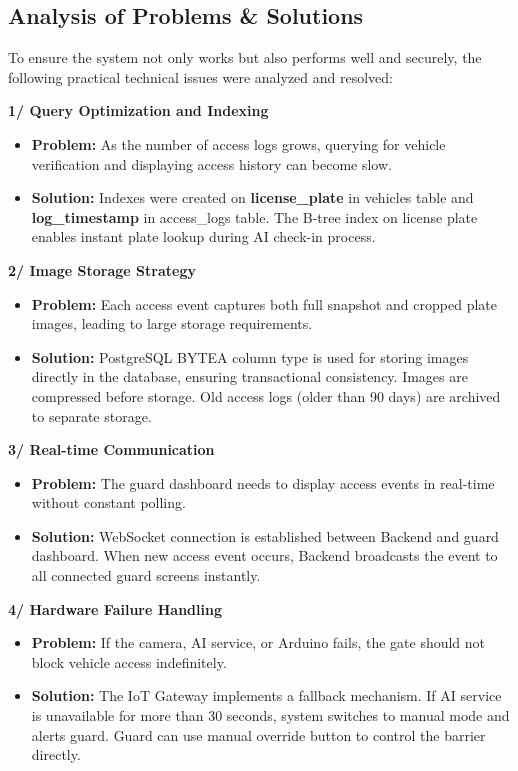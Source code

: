 \documentclass[a4paper]{article}
\begin{document}
\subsection{Analysis of Problems \& Solutions}
To ensure the system not only works but also performs well and securely, the following practical technical issues were analyzed and resolved:

\noindent \textbf{1/ Query Optimization and Indexing}
\begin{itemize}
    \item \textbf{Problem:} As the number of access logs grows, querying for vehicle verification and displaying access history can become slow.
    \item \textbf{Solution:} Indexes were created on \textbf{license\_plate} in vehicles table and \textbf{log\_timestamp} in access\_logs table. The B-tree index on license plate enables instant plate lookup during AI check-in process.
\end{itemize}

\noindent \textbf{2/ Image Storage Strategy}
\begin{itemize}
    \item \textbf{Problem:} Each access event captures both full snapshot and cropped plate images, leading to large storage requirements.
    \item \textbf{Solution:} PostgreSQL BYTEA column type is used for storing images directly in the database, ensuring transactional consistency. Images are compressed before storage. Old access logs (older than 90 days) are archived to separate storage.
\end{itemize}

\noindent \textbf{3/ Real-time Communication}
\begin{itemize}
    \item \textbf{Problem:} The guard dashboard needs to display access events in real-time without constant polling.
    \item \textbf{Solution:} WebSocket connection is established between Backend and guard dashboard. When new access event occurs, Backend broadcasts the event to all connected guard screens instantly.
\end{itemize}

\noindent \textbf{4/ Hardware Failure Handling}
\begin{itemize}
    \item \textbf{Problem:} If the camera, AI service, or Arduino fails, the gate should not block vehicle access indefinitely.
    \item \textbf{Solution:} The IoT Gateway implements a fallback mechanism. If AI service is unavailable for more than 30 seconds, system switches to manual mode and alerts guard. Guard can use manual override button to control the barrier directly.
\end{itemize}
\end{document}
